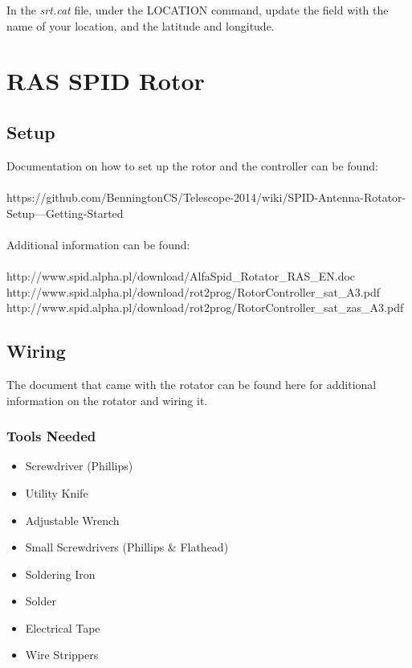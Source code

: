 \documentclass[11pt]{article} %
\begin{document}
In the \emph{srt.cat} file, under the LOCATION command, update the field with the name of your location, and the latitude and longitude. 






\newpage
\section{RAS SPID Rotor}

\subsection{Setup}

Documentation on how to set up the rotor and the controller can be found: \\ \\
https://github.com/BenningtonCS/Telescope-2014/wiki/SPID-Antenna-Rotator-Setup---Getting-Started
\\ \\
Additional information can be found: \\ \\
http://www.spid.alpha.pl/download/AlfaSpid\_Rotator\_RAS\_EN.doc \\
http://www.spid.alpha.pl/download/rot2prog/RotorController\_sat\_A3.pdf \\
http://www.spid.alpha.pl/download/rot2prog/RotorController\_sat\_zas\_A3.pdf \\




\subsection{Wiring}


The document that came with the rotator can be found here for additional information on the rotator and wiring it.

\subsubsection{Tools Needed}
\begin{itemize}
\item Screwdriver (Phillips)
\item Utility Knife
\item Adjustable Wrench
\item Small Screwdrivers (Phillips \& Flathead)
\item Soldering Iron
\item Solder
\item Electrical Tape
\item Wire Strippers
\end{itemize}
\end{document}
